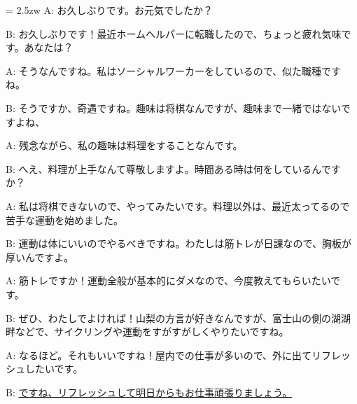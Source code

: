 \documentclass[11pt]{amsart}
\title{}
\author{}
\newenvironment{hangall}[1]{\hangindent = 2.5zw\everypar{\hangindent = 2.5zw}}{}
\begin{document}
\maketitle
\begin{hangall}{}%
A: お久しぶりです。お元気でしたか？

B: お久しぶりです！最近ホームヘルパーに転職したので、ちょっと疲れ気味です。あなたは？

A: そうなんですね。私はソーシャルワーカーをしているので、似た職種ですね。

B: そうですか、奇遇ですね。趣味は将棋なんですが、趣味まで一緒ではないですよね、

A: 残念ながら、私の趣味は料理をすることなんです。

B: へえ、料理が上手なんて尊敬しますよ。時間ある時は何をしているんですか？

A: 私は将棋できないので、やってみたいです。料理以外は、最近太ってるので苦手な運動を始めました。

B: 運動は体にいいのでやるべきですね。わたしは筋トレが日課なので、胸板が厚いんですよ。

A: 筋トレですか！運動全般が基本的にダメなので、今度教えてもらいたいです。

B: ぜひ、わたしでよければ！山梨の方言が好きなんですが、富士山の側の湖湖畔などで、サイクリングや運動をすがすがしくやりたいですね。

A: なるほど。それもいいですね！屋内での仕事が多いので、外に出てリフレッシュしたいです。

B: \ul{ですね、リフレッシュして明日からもお仕事頑張りましょう。}\end{hangall}
\end{document}
